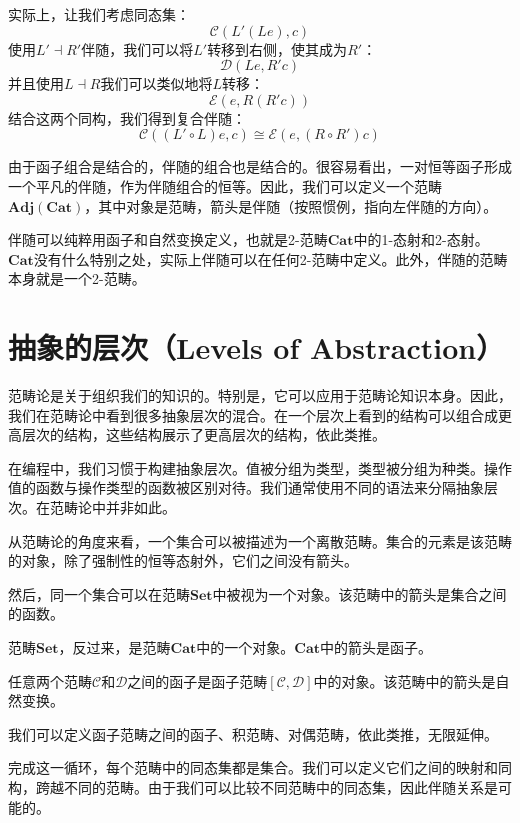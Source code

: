 \documentclass[DaoFP]{subfiles}
\begin{document}
    实际上，让我们考虑同态集：
    \[ \mathcal{C}(L' (L e), c) \]
    使用$L' \dashv R'$伴随，我们可以将$L'$转移到右侧，使其成为$R'$：
    \[ \mathcal{D}(L e, R' c) \]
    并且使用$L \dashv R$我们可以类似地将$L$转移：
    \[ \mathcal{E}( e, R(R' c)) \]
    结合这两个同构，我们得到复合伴随：
    \[ \mathcal{C}((L' \circ L) e, c) \cong \mathcal{E}( e, (R \circ R') c)\]

    由于函子组合是结合的，伴随的组合也是结合的。很容易看出，一对恒等函子形成一个平凡的伴随，作为伴随组合的恒等。因此，我们可以定义一个范畴$\mathbf{Adj}(\mathbf{Cat})$，其中对象是范畴，箭头是伴随（按照惯例，指向左伴随的方向）。

    伴随可以纯粹用函子和自然变换定义，也就是2-范畴$\mathbf{Cat}$中的1-态射和2-态射。$\mathbf{Cat}$没有什么特别之处，实际上伴随可以在任何2-范畴中定义。此外，伴随的范畴本身就是一个2-范畴。

    \section{抽象的层次（Levels of Abstraction）}

    范畴论是关于组织我们的知识的。特别是，它可以应用于范畴论知识本身。因此，我们在范畴论中看到很多抽象层次的混合。在一个层次上看到的结构可以组合成更高层次的结构，这些结构展示了更高层次的结构，依此类推。

    在编程中，我们习惯于构建抽象层次。值被分组为类型，类型被分组为种类。操作值的函数与操作类型的函数被区别对待。我们通常使用不同的语法来分隔抽象层次。在范畴论中并非如此。

    从范畴论的角度来看，一个集合可以被描述为一个离散范畴。集合的元素是该范畴的对象，除了强制性的恒等态射外，它们之间没有箭头。

    然后，同一个集合可以在范畴$\mathbf{Set}$中被视为一个对象。该范畴中的箭头是集合之间的函数。

    范畴$\mathbf{Set}$，反过来，是范畴$\mathbf{Cat}$中的一个对象。$\mathbf{Cat}$中的箭头是函子。

    任意两个范畴$\mathcal{C}$和$\mathcal{D}$之间的函子是函子范畴$[\mathcal{C}, \mathcal{D}]$中的对象。该范畴中的箭头是自然变换。

    我们可以定义函子范畴之间的函子、积范畴、对偶范畴，依此类推，无限延伸。

    完成这一循环，每个范畴中的同态集都是集合。我们可以定义它们之间的映射和同构，跨越不同的范畴。由于我们可以比较不同范畴中的同态集，因此伴随关系是可能的。
\end{document}
